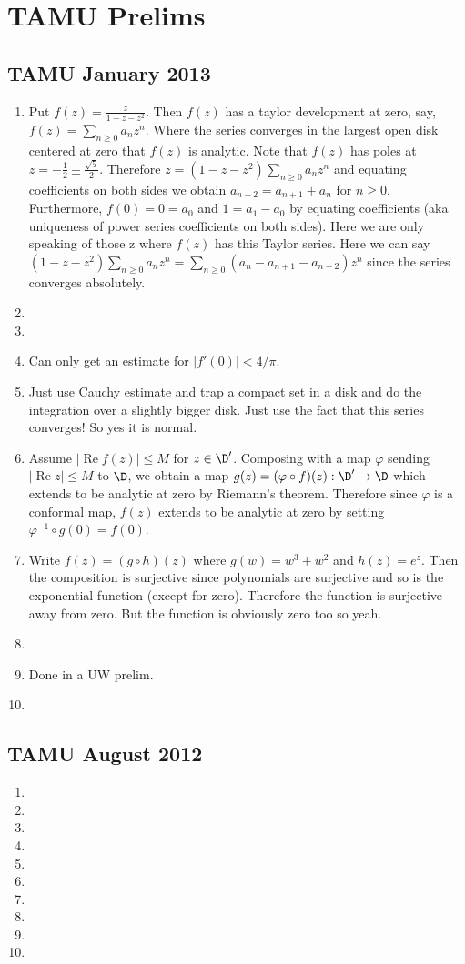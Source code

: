 \documentclass[11pt]{book}
\theoremstyle{definition}
\renewcommand{\Re}{\operatorname{Re}}
\begin{document}
\chapter{TAMU Prelims}
\section{TAMU January 2013}
\begin{enumerate}
\item Put $f(z)=\frac{z}{1-z-z^2}$. Then $f(z)$ has a taylor development at zero, say, $f(z)=\sum_{n\geq0}a_nz^n$. Where the series converges in the largest open disk centered at zero that $f(z)$ is analytic. Note that $f(z)$ has poles at $z=-\frac{1}{2}\pm\frac{\sqrt{5}}{2}$. Therefore $z=(1-z-z^2)\sum_{n\geq0}a_nz^n$ and equating coefficients on both sides we obtain $a_{n+2}=a_{n+1}+a_{n}$ for $n\geq 0$. Furthermore, $f(0)=0=a_0$ and $1=a_1-a_0$ by equating coefficients (aka uniqueness of power series coefficients on both sides). Here we are only speaking of those z where $f(z)$ has this Taylor series. Here we can say $(1-z-z^2)\sum_{n\geq0}a_nz^n=\sum_{n\geq0}(a_n-a_{n+1}-a_{n+2})z^n$ since the series converges absolutely.
\item
\item
\item Can only get an estimate for $|f'(0)|<4/\pi$.
\item Just use Cauchy estimate and trap a compact set in a disk and do the integration over a slightly bigger disk. Just use the fact that this series converges! So yes it is normal.
\item Assume $|\Re f(z)|\leq M$ for $z\in \D'$. Composing with a map $\varphi$ sending $|\Re z|\leq M$ to $\D$, we obtain a map $g(z)=(\varphi\circ f)(z):\D'\to \D$ which extends to be analytic at zero by Riemann's theorem. Therefore since $\varphi$ is a conformal map, $f(z)$ extends to be analytic at zero by setting $\varphi^{-1}\circ g(0)=f(0)$. 
\item Write $f(z)=(g\circ h)(z)$ where $g(w)=w^3+w^2$ and $h(z)=e^z$. Then the composition is surjective since polynomials are surjective and so is the exponential function (except for zero). Therefore the function is surjective away from zero. But the function is obviously zero too so yeah.
\item 
\item Done in a UW prelim.
\item 
\end{enumerate}
\section{TAMU August 2012}
\begin{enumerate}
\item
\item
\item
\item
\item
\item
\item
\item
\item
\item
\end{enumerate}
\end{document}
